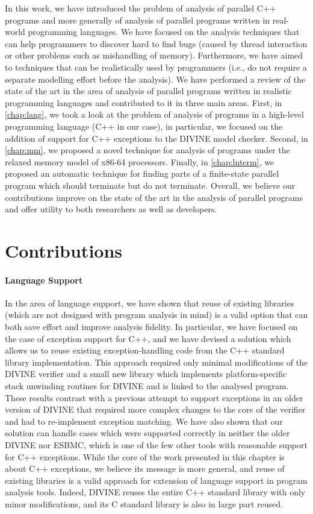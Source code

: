 In this work, we have introduced the problem of analysis of parallel C++ programs and more generally of analysis of parallel programs written in real-world programming languages.
We have focused on the analysis techniques that can help programmers to discover hard to find bugs (caused by thread interaction or other problems such as mishandling of memory).
Furthermore, we have aimed to techniques that can be realistically used by programmers (i.e., do not require a separate modelling effort before the analysis).
We have performed a review of the state of the art in the area of analysis of parallel programs written in realistic programming languages and contributed to it in three main areas.
First, in \autoref{chap:lang}, we took a look at the problem of analysis of programs in a high-level programming language (C++ in our case), in particular, we focused on the addition of support for C++ exceptions to the DIVINE model checker.
Second, in \autoref{chap:mm}, we proposed a novel technique for analysis of programs under the relaxed memory model of x86-64 processors.
Finally, in \autoref{chap:lnterm}, we proposed an automatic technique for finding parts of a finite-state parallel program which should terminate but do not terminate.
Overall, we believe our contributions improve on the state of the art in the analysis of parallel programs and offer utility to both researchers as well as developers.

\section{Contributions}

\paragraph{Language Support}

In the area of language support, we have shown that reuse of existing libraries (which are not designed with program analysis in mind) is a valid option that can both save effort and improve analysis fidelity.
In particular, we have focused on the case of exception support for C++, and we have devised a solution which allows us to reuse existing exception-handling code from the C++ standard library implementation.
This approach required only minimal modifications of the DIVINE verifier and a small new library which implements platform-specific stack unwinding routines for DIVINE and is linked to the analysed program.
These results contrast with a previous attempt to support exceptions in an older version of DIVINE that required more complex changes to the core of the verifier and had to re-implement exception matching.
We have also shown that our solution can handle cases which were supported correctly in neither the older DIVINE nor ESBMC, which is one of the few other tools with reasonable support for C++ exceptions.
While the core of the work presented in this chapter is about C++ exceptions, we believe its message is more general, and reuse of existing libraries is a valid approach for extension of language support in program analysis tools.
Indeed, DIVINE reuses the entire C++ standard library with only minor modifications, and its C standard library is also in large part reused.


